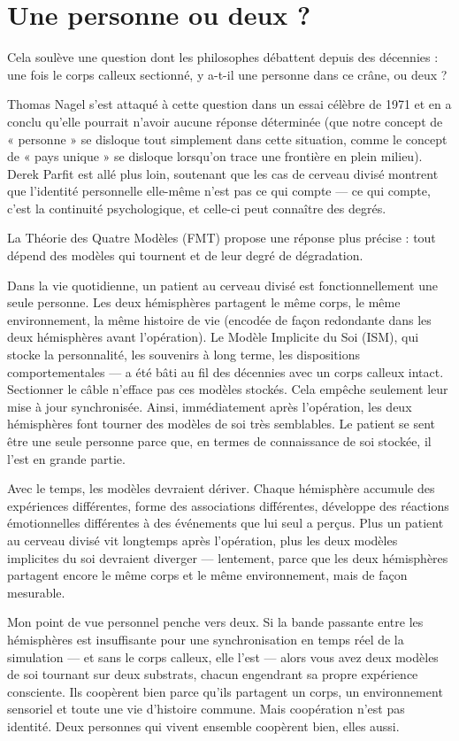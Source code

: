 \documentclass[11pt, twoside, openright]{book}
\begin{document}
\section*{Une personne ou deux ?}

Cela soulève une question dont les philosophes débattent depuis des décennies : une fois le corps calleux sectionné, y a-t-il une personne dans ce crâne, ou deux ?

Thomas Nagel s'est attaqué à cette question dans un essai célèbre de 1971 et en a conclu qu'elle pourrait n'avoir aucune réponse déterminée (que notre concept de « personne » se disloque tout simplement dans cette situation, comme le concept de « pays unique » se disloque lorsqu'on trace une frontière en plein milieu). Derek Parfit est allé plus loin, soutenant que les cas de cerveau divisé montrent que l'identité personnelle elle-même n'est pas ce qui compte --- ce qui compte, c'est la continuité psychologique, et celle-ci peut connaître des degrés.

La Théorie des Quatre Modèles (FMT) propose une réponse plus précise : tout dépend des modèles qui tournent et de leur degré de dégradation.

Dans la vie quotidienne, un patient au cerveau divisé est fonctionnellement une seule personne. Les deux hémisphères partagent le même corps, le même environnement, la même histoire de vie (encodée de façon redondante dans les deux hémisphères avant l'opération). Le Modèle Implicite du Soi (ISM), qui stocke la personnalité, les souvenirs à long terme, les dispositions comportementales --- a été bâti au fil des décennies avec un corps calleux intact. Sectionner le câble n'efface pas ces modèles stockés. Cela empêche seulement leur mise à jour synchronisée. Ainsi, immédiatement après l'opération, les deux hémisphères font tourner des modèles de soi très semblables. Le patient se sent être une seule personne parce que, en termes de connaissance de soi stockée, il l'est en grande partie.

Avec le temps, les modèles devraient dériver. Chaque hémisphère accumule des expériences différentes, forme des associations différentes, développe des réactions émotionnelles différentes à des événements que lui seul a perçus. Plus un patient au cerveau divisé vit longtemps après l'opération, plus les deux modèles implicites du soi devraient diverger --- lentement, parce que les deux hémisphères partagent encore le même corps et le même environnement, mais de façon mesurable.

Mon point de vue personnel penche vers deux. Si la bande passante entre les hémisphères est insuffisante pour une synchronisation en temps réel de la simulation --- et sans le corps calleux, elle l'est --- alors vous avez deux modèles de soi tournant sur deux substrats, chacun engendrant sa propre expérience consciente. Ils coopèrent bien parce qu'ils partagent un corps, un environnement sensoriel et toute une vie d'histoire commune. Mais coopération n'est pas identité. Deux personnes qui vivent ensemble coopèrent bien, elles aussi.
\end{document}
